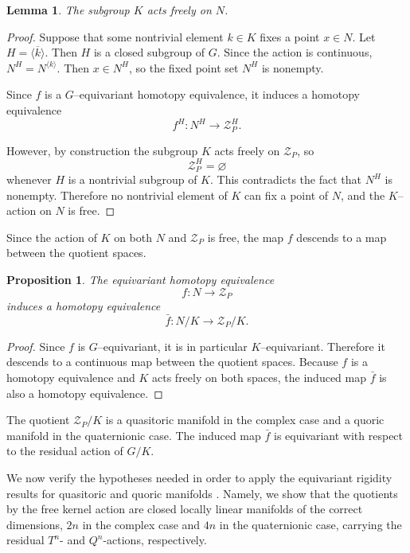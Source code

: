 \documentclass[11pt,a4paper]{article}
\numberwithin{equation}{section}
\newtheorem{prop}[definition]{Proposition}
\newtheorem{lemma}[definition]{Lemma}
\theoremstyle{named}
\begin{document}
\begin{lemma}\label{lem:Kfree}
The subgroup $K$ acts freely on $N$.
\end{lemma}
\begin{proof}
Suppose that some nontrivial element $k\in K$ fixes a point $x\in N$. Let $H=\overline{\langle k\rangle}$. Then \(H\) is a closed subgroup of \(G\). Since the action is continuous, $N^H=N^{\langle k\rangle}$. Then $x\in N^H$, so the fixed point set $N^H$ is nonempty.

Since $f$ is a $G$--equivariant homotopy equivalence, it induces a homotopy equivalence
\[
f^H:N^H\longrightarrow \mathcal Z_P^H .
\]

However, by construction the subgroup $K$ acts freely on $\mathcal Z_P$, so
\[
\mathcal Z_P^H=\varnothing
\]
whenever $H$ is a nontrivial subgroup of $K$. This contradicts the fact that $N^H$ is nonempty. Therefore no nontrivial element of $K$ can fix a point of $N$, and the $K$--action on $N$ is free.
\end{proof}

Since the action of $K$ on both $N$ and $\mathcal Z_P$ is free, the map $f$ descends to a map between the quotient spaces.

\begin{prop}\label{prop:pushdown}
The equivariant homotopy equivalence
\[
f:N\longrightarrow \mathcal Z_P
\]
induces a homotopy equivalence
\[
\bar f:N/K\longrightarrow \mathcal Z_P/K .
\]
\end{prop}

\begin{proof}
Since $f$ is $G$--equivariant, it is in particular $K$--equivariant. Therefore it descends to a continuous map between the quotient spaces. Because $f$ is a homotopy equivalence and $K$ acts freely on both spaces, the induced map $\bar f$ is also a homotopy equivalence.
\end{proof}

The quotient $\mathcal Z_P/K$ is a quasitoric manifold in the complex case and a quoric manifold in the quaternionic case. The induced map $\bar f$ is equivariant with respect to the residual action of $G/K$.

We now verify the hypotheses needed in order to apply the equivariant rigidity results for quasitoric \cite{mp} and quoric manifolds \cite{gp}. Namely, we show that the quotients by the free kernel action are closed locally linear manifolds of the correct dimensions, \(2n\) in the complex case and \(4n\) in the quaternionic case, carrying the residual \(T^n\)- and \(Q^n\)-actions, respectively.
\end{document}
